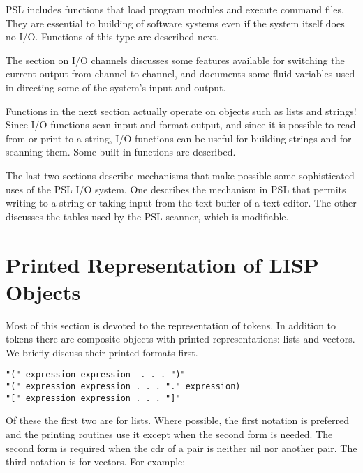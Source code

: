   PSL includes functions that load program modules  and  execute
command  files.    They  are  essential  to building of software
systems even if the system itself does no  I/O.    Functions  of
this type are described next.

  The  section on I/O channels discusses some features available
for switching the current output from channel  to  channel,  and
documents  some  fluid  variables  used in directing some of the
system's input and output.

  Functions in the next section actually operate on objects such
as lists and strings!  Since I/O functions scan input and format
output, and since it is possible to read  from  or  print  to  a
string, I/O functions can be useful for building strings and for
scanning them.  Some built-in functions are described.

  The  last  two sections describe mechanisms that make possible
some sophisticated uses of the PSL I/O system.    One  describes
the  mechanism in PSL that permits writing to a string or taking
input from the  text  buffer  of  a  text  editor.    The  other
discusses   the  tables  used  by  the  PSL  scanner,  which  is
modifiable.

\section{Printed Representation of LISP Objects}

  Most of this section  is  devoted  to  the  representation  of
tokens.   In addition to tokens there are composite objects with
printed representations: lists and vectors.  We briefly  discuss
their printed formats first.
\begin{verbatim}
"(" expression expression  . . . ")"
"(" expression expression . . . "." expression)
"[" expression expression . . . "]"
\end{verbatim}

  Of  these  the  first  two are for lists.  Where possible, the
first notation is preferred and the  printing  routines  use  it
except  when  the  second  form  is  needed.  The second form is
required when the cdr of a pair is neither nil nor another pair.
The third notation is for vectors.  For example:

